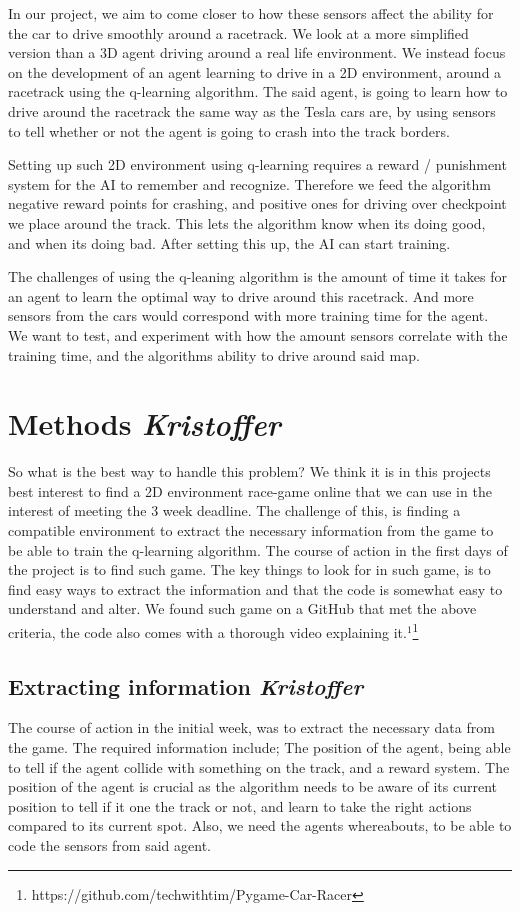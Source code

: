 In our project, we aim to come closer to how these sensors affect the ability for the car to drive smoothly around a racetrack. We look at a more simplified version than a 3D agent driving around a real life environment. We instead focus on the development of an agent learning to drive in a 2D environment, around a racetrack using the q-learning algorithm. The said agent, is going to learn how to drive around the racetrack the same way as the Tesla cars are, by using sensors to tell whether or not the agent is going to crash into the track borders. 

Setting up such 2D environment using q-learning requires a reward / punishment system for the AI to remember and recognize. Therefore we feed the algorithm negative reward points for crashing, and positive ones for driving over checkpoint we place around the track. This lets the algorithm know when its doing good, and when its doing bad. After setting this up, the AI can start training.

The challenges of using the q-leaning algorithm is the amount of time it takes for an agent to learn the optimal way to drive around this racetrack. And more sensors from the cars would correspond with more training time for the agent. We want to test, and experiment with how the amount sensors correlate with the training time, and the algorithms ability to drive around said map.


\section{Methods \small\textit{Kristoffer}}
\vspace{3mm}
So what is the best way to handle this problem? We think it is in this projects best interest to find a 2D environment race-game online that we can use in the interest of meeting the 3 week deadline. The challenge of this, is finding a compatible environment to extract the necessary information from the game to be able to train the q-learning algorithm. The course of action in the first days of the project is to find such game. The key things to look for in such game, is to find easy ways to extract the information and that the code is somewhat easy to understand and alter. 
We found such game on a GitHub that met the above criteria, the code also comes with a thorough video explaining it.$^1$\footnote{https://github.com/techwithtim/Pygame-Car-Racer}

\subsection{Extracting information \small\textit{Kristoffer}}
\vspace{3mm}
The course of action in the initial week, was to extract the necessary data from the game. The required information include; The position of the agent, being able to tell if the agent collide with something on the track, and a reward system. The position of the agent is crucial as the algorithm needs to be aware of its current position to tell if it one the track or not, and learn to take the right actions compared to its current spot. Also, we need the agents whereabouts, to be able to code the sensors from said agent.

